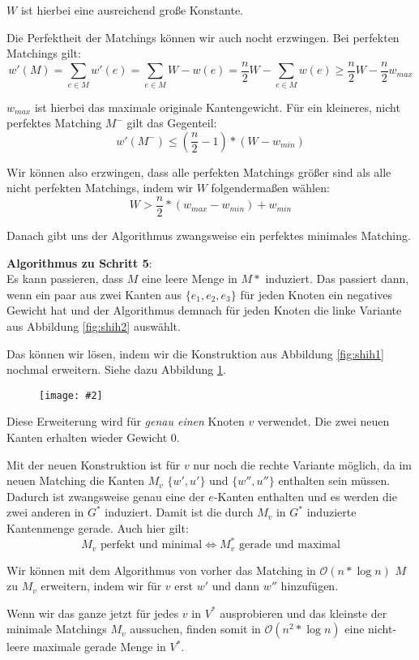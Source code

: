 \documentclass[10pt,a4paper]{article}
\makeatletter
\def\maxwidth#1{\ifdim\Gin@nat@width>#1 #1\else\Gin@nat@width\fi}
\newcommand{\imageFigure}[4]{%
    \begin{figure}[h]%
        \centering%
        {%
            \setlength{\fboxsep}{1pt}%
            \setlength{\fboxrule}{1pt}%
            \texttt{[image: \#2]}%
        }%
        \caption{#1}%
        \label{fig:#4}%
    \end{figure}%
}
\makeatother
\begin{document}
$W$ ist hierbei eine ausreichend große Konstante.

Die Perfektheit der Matchings können wir auch nocht erzwingen.
Bei perfekten Matchings gilt:
$$ w'(M) = \sum_{e \in M}{w'(e)} = \sum_{e \in M}{W - w(e)} =
\frac{n}{2}W - \sum_{e \in M}{w(e)} \geq \frac{n}{2}W - \frac{n}{2}w_{max}$$

$w_{max}$ ist hierbei das maximale originale Kantengewicht.
Für ein kleineres, nicht perfektes Matching $M^-$ gilt das Gegenteil:
$$ w'(M^-) \leq (\frac{n}{2} - 1) * (W - w_{min}) $$

Wir können also erzwingen, dass alle perfekten Matchings größer sind als alle
nicht perfekten Matchings, indem wir $W$ folgendermaßen wählen:
$$ W > \frac{n}{2} * (w_{max} - w_{min}) + w_{min} $$

Danach gibt uns der Algorithmus zwangsweise ein perfektes minimales Matching.

\textbf{Algorithmus zu Schritt 5}:\\
Es kann passieren, dass $M$ eine leere Menge in $M*$ induziert.
Das passiert dann, wenn ein paar aus zwei Kanten aus $\{e_1, e_2, e_3\}$ für
jeden Knoten ein negatives Gewicht hat und der Algorithmus demnach für jeden
Knoten die linke Variante aus Abbildung \ref{fig:shih2} auswählt.

Das können wir lösen, indem wir die Konstruktion aus Abbildung \ref{fig:shih1}
nochmal erweitern.
Siehe dazu Abbildung \ref{fig:shih3}.

\imageFigure{}{shih3.png}{.7}{shih3}

Diese Erweiterung wird für \textit{genau einen} Knoten $v$ verwendet.
Die zwei neuen Kanten erhalten wieder Gewicht 0.

Mit der neuen Konstruktion ist für $v$ nur noch die rechte Variante möglich, da
im neuen Matching die Kanten $M_v$ $\{w', u'\}$ und $\{w'', u''\}$ enthalten
sein müssen.
Dadurch ist zwangsweise genau eine der $e$-Kanten enthalten und es werden die
zwei anderen in $G^*$ induziert.
Damit ist die durch $M_v$ in $G^*$ induzierte Kantenmenge gerade.
Auch hier gilt:
$$ M_v \text{ perfekt und minimal} \iff M_v^* \text{ gerade und maximal} $$

Wir können mit dem Algorithmus von vorher das Matching in $\mathcal{O}(n*\log
n)$ $M$ zu $M_v$ erweitern, indem wir für $v$ erst $w'$ und dann $w''$
hinzufügen.

Wenn wir das ganze jetzt für jedes $v$ in $V^*$ ausprobieren und das kleinste
der minimale Matchings $M_v$ aussuchen, finden somit in $\mathcal{O}(n^2*\log
n)$ eine nicht-leere maximale gerade Menge in $V^*$.
\end{document}

